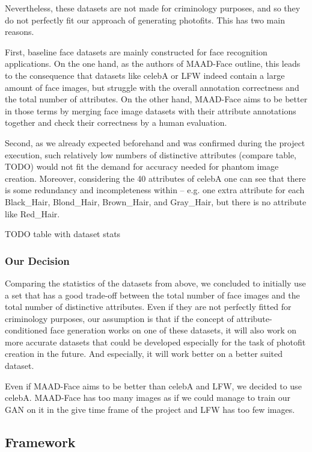 \documentclass[12pt, a4paper]{article}
\begin{document}
Nevertheless, these datasets are not made for criminology purposes, and so they do not perfectly fit our approach of
generating photofits. This has two main reasons.

First, baseline face datasets are mainly constructed for face recognition applications. On the one hand, as the authors
of MAAD-Face outline, this leads to the consequence that datasets like
celebA or LFW indeed contain a large amount of face images, but struggle with the overall annotation correctness and the total number of attributes.
On the other hand, MAAD-Face aims to be better in those terms by merging
face image datasets with their attribute annotations together and check their correctness by a human evaluation.

Second, as we already expected beforehand and was confirmed during the project execution, such relatively low numbers of
distinctive attributes (compare table, TODO) would not fit the demand for accuracy needed for phantom image creation.
Moreover, considering the 40 attributes of celebA one can see that
there is some redundancy and incompleteness within -- e.g. one extra attribute for each Black\_Hair, Blond\_Hair,
Brown\_Hair, and Gray\_Hair, but there is no attribute like  Red\_Hair.

TODO table with dataset stats

\subsubsection{Our Decision}
Comparing the statistics of the datasets from above, we concluded to initially use a set that has a good trade-off
between the total number of face images and the total number of distinctive attributes. Even if they are not perfectly
fitted for criminology purposes, our assumption is that if the concept of attribute-conditioned face generation works on
one of these datasets, it will also work on more accurate datasets that could be developed especially for the task of
photofit creation in the future. And especially, it will work better on a better suited dataset.

Even if MAAD-Face aims to be better than
celebA and LFW, we decided to
use celebA. MAAD-Face has too many images as if we could manage to train our GAN on it in the give time frame of the project and LFW has too few images.

\subsection{Framework}
\end{document}
